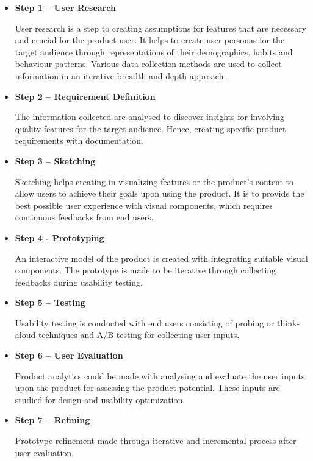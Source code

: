       \begin{itemize}
        \item \textbf{Step 1 – User Research}
          \par User research is a step to creating assumptions for features that are necessary and crucial for the product user. It helps to create user personas for the target audience through representations of their demographics, habits and behaviour patterns. Various data collection methods are used to collect information in an iterative breadth-and-depth approach.
        \item \textbf{Step 2 – Requirement Definition}
          \par The information collected are analysed to discover insights for involving quality features for the target audience. Hence, creating specific product requirements with documentation.
        \item \textbf{Step 3 – Sketching}
          \par Sketching helps creating in visualizing features or the product’s content to allow users to achieve their goals upon using the product. It is to provide the best possible user experience with visual components, which requires continuous feedbacks from end users.
        \item \textbf{Step 4 - Prototyping}
          \par An interactive model of the product is created with integrating suitable visual components. The prototype is made to be iterative through collecting feedbacks during usability testing.
        \item \textbf{Step 5 – Testing}
          \par Usability testing is conducted with end users consisting of probing or think-aloud techniques and A/B testing for collecting user inputs.
        \item \textbf{Step 6 – User Evaluation}
          \par Product analytics could be made with analysing and evaluate the user inputs upon the product for assessing the product potential. These inputs are studied for design and usability optimization.
        \item \textbf{Step 7 – Refining}
          \par Prototype refinement made through iterative and incremental process after user evaluation.
      \end{itemize}

